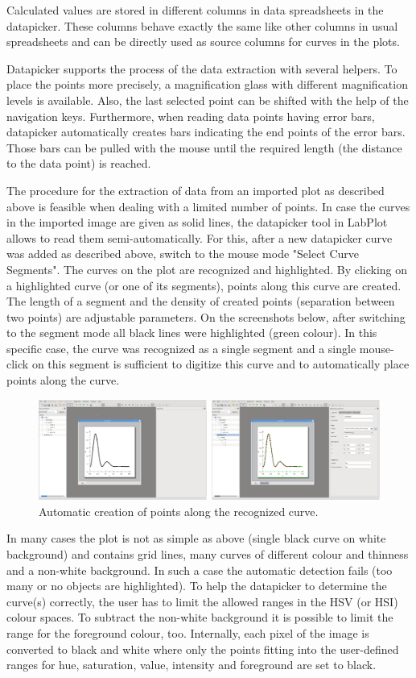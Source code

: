 Calculated values are stored in different columns in data spreadsheets in the datapicker. These columns behave exactly the same like other columns
in usual spreadsheets and can be directly used as source columns for curves in the plots.

Datapicker supports the process of the data extraction with several helpers. To place the points more precisely, a magnification glass with different magnification levels is available.
Also, the last selected point can be shifted with the help of the navigation keys.
Furthermore, when reading data points having error bars, datapicker automatically creates bars indicating the end points of the error bars.
Those bars can be pulled with the mouse until the required length (the distance to the data point) is reached.

The procedure for the extraction of data from an imported plot as described above is feasible when dealing with a limited number of points.
In case the curves in the imported image are given as solid lines, the datapicker tool in LabPlot allows to read them semi-automatically.
For this, after a new datapicker curve was added as described above, switch to the mouse mode "Select Curve Segments". The curves on the plot are recognized and highlighted.
By clicking on a highlighted curve (or one of its segments), points along this curve are created.
The length of a segment and the density of created points (separation between two points) are adjustable parameters.
On the screenshots below, after switching to the segment mode all black lines were highlighted (green colour).
In this specific case, the curve was recognized as a single segment and a single mouse-click on this segment is sufficient to digitize this curve and to automatically place points along the curve.
\begin{figure}
\includegraphics[width=\textwidth]{images/datapicker_segments.png}
\caption{Automatic creation of points along the recognized curve.}
\end{figure}

In many cases the plot is not as simple as above (single black curve on white background) and contains grid lines, many curves of different colour and thinness and a non-white background.
In such a case the automatic detection fails (too many or no objects are highlighted). To help the datapicker to determine the curve(s) correctly, the user has to limit the allowed ranges in the HSV (or HSI) colour spaces.
To subtract the non-white background it is possible to limit the range for the foreground colour, too.
Internally, each pixel of the image is converted to black and white where only the points fitting into the user-defined ranges for hue, saturation, value, intensity and foreground are set to black.

